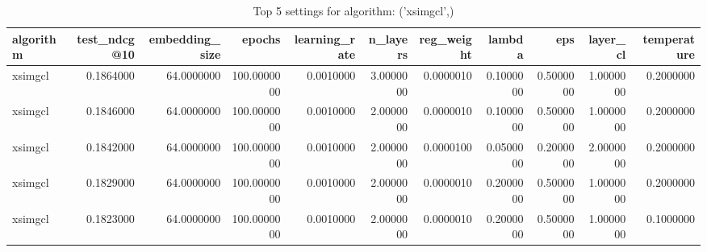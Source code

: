 \begin{table}
\caption{Top 5 settings for algorithm: ('xsimgcl',)}
\label{tab:('xsimgcl',)_top5}
\begin{tabular}{lrrrrrrrrrr}
\toprule
algorithm & test_ndcg@10 & embedding_size & epochs & learning_rate & n_layers & reg_weight & lambda & eps & layer_cl & temperature \\
\midrule
xsimgcl & 0.1864000 & 64.0000000 & 100.0000000 & 0.0010000 & 3.0000000 & 0.0000010 & 0.1000000 & 0.5000000 & 1.0000000 & 0.2000000 \\
xsimgcl & 0.1846000 & 64.0000000 & 100.0000000 & 0.0010000 & 2.0000000 & 0.0000010 & 0.1000000 & 0.5000000 & 1.0000000 & 0.2000000 \\
xsimgcl & 0.1842000 & 64.0000000 & 100.0000000 & 0.0010000 & 2.0000000 & 0.0000100 & 0.0500000 & 0.2000000 & 2.0000000 & 0.2000000 \\
xsimgcl & 0.1829000 & 64.0000000 & 100.0000000 & 0.0010000 & 2.0000000 & 0.0000010 & 0.2000000 & 0.5000000 & 1.0000000 & 0.2000000 \\
xsimgcl & 0.1823000 & 64.0000000 & 100.0000000 & 0.0010000 & 2.0000000 & 0.0000010 & 0.2000000 & 0.5000000 & 1.0000000 & 0.1000000 \\
\bottomrule
\end{tabular}
\end{table}



